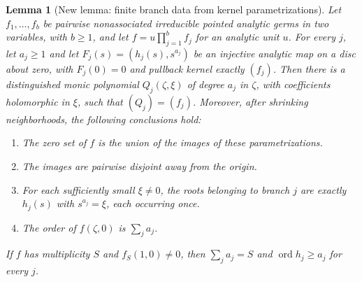\documentclass[11pt,oneside]{report}
\newtheorem{lemma}[theorem]{Lemma}
\theoremstyle{definition}
\numberwithin{equation}{section}
\newcommand{\ord}{\operatorname{ord}}
\begin{document}
\begin{lemma}[New lemma: finite branch data from kernel parametrizations]
\label{J14:lem:packaging}
Let $f_1,\ldots,f_b$ be pairwise nonassociated irreducible pointed analytic
germs in two variables, with $b\geq1$, and let
$f=u\prod_{j=1}^b f_j$ for an analytic unit $u$.
For every $j$, let $a_j\geq1$ and let
$F_j(s)=(h_j(s),s^{a_j})$ be an injective analytic map on a disc about zero,
with $F_j(0)=0$ and pullback kernel exactly $(f_j)$.
Then there is a distinguished monic polynomial
$Q_j(\zeta,\xi)$ of degree $a_j$ in $\zeta$, with coefficients holomorphic
in $\xi$, such that $(Q_j)=(f_j)$. Moreover, after shrinking neighborhoods,
the following conclusions hold:
\begin{enumerate}
\item The zero set of $f$ is the union of the images of these parametrizations.
\item The images are pairwise disjoint away from the origin.
\item For each sufficiently small $\xi\ne0$, the roots belonging to branch
$j$ are exactly $h_j(s)$ with $s^{a_j}=\xi$, each occurring once.
\item The order of $f(\zeta,0)$ is $\sum_j a_j$.
\end{enumerate}
If $f$ has multiplicity $S$ and $f_S(1,0)\ne0$, then
$\sum_j a_j=S$ and $\ord h_j\geq a_j$ for every $j$.
\end{lemma}
\end{document}
